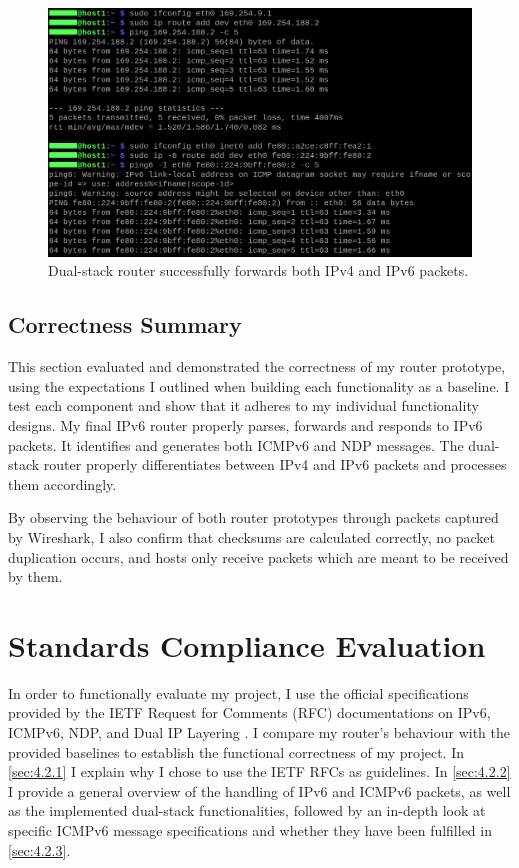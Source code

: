 \begin{figure}[htbp]
  \centering
    \includegraphics[width=1\textwidth]{figures/evaluation/dualstack_test.png}
     \caption{Dual-stack router successfully forwards both IPv4 and IPv6 packets.}
     \label{fig:eval-dualtest}
\end{figure}



\subsection{Correctness Summary}
\label{sec:4.1.}

This section evaluated and demonstrated the correctness of my router prototype, using the expectations I outlined when building each functionality as a baseline. I test each component and show that it adheres to my individual functionality designs. My final IPv6 router properly parses, forwards and responds to IPv6 packets. It identifies and generates both ICMPv6 and NDP messages. The dual-stack router properly differentiates between IPv4 and IPv6 packets and processes them accordingly. 

By observing the behaviour of both router prototypes through packets captured by Wireshark, I also confirm that checksums are calculated correctly, no packet duplication occurs, and hosts only receive packets which are meant to be received by them.



\section{Standards Compliance Evaluation}
\label{sec:4.2}

In order to functionally evaluate my project, I use the official specifications provided by the IETF Request for Comments (RFC) documentations on IPv6, ICMPv6, NDP, and Dual IP Layering \cite{IPv6Specs, ICMPv6Specs, NDPSpecs, DualStackSpecs}. I compare my router's behaviour with the provided baselines to establish the functional correctness of my project. In \cref{sec:4.2.1} I explain why I chose to use the IETF RFCs as guidelines. In \cref{sec:4.2.2} I provide a general overview of the handling of IPv6 and ICMPv6 packets, as well as the implemented dual-stack functionalities, followed by an in-depth look at specific ICMPv6 message specifications and whether they have been fulfilled in \cref{sec:4.2.3}.



